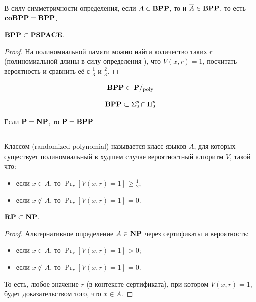 \begin{definition}
В силу симметричности определения, если $A \in \textbf{BPP}$, то и $\overline{A} \in \textbf{BPP}$, то есть $\mathbf{coBPP} = \textbf{BPP}$.
\end{definition}

\begin{statement}
$\textbf{BPP} \subset \textbf{PSPACE}$.
\end{statement}

\begin{proof} На полиномиальной памяти можно найти количество таких $r$ (полиномиальной длины в силу определения \bpp), что $V(x, r) = 1$, посчитать вероятность и сравнить её с $\frac{1}{3}$ и $\frac{2}{3}$.
\end{proof}

\begin{theorem}[Эйдлмана]
$$
\textbf{BPP} \subset \textbf{P}/_{\mathrm{poly}}
$$
\end{theorem}

\begin{theorem}
$$
\textbf{BPP} \subset \Sigma_2^p \cap \Pi_2^p
$$
\end{theorem}

\begin{corollary}
Если $\textbf{P} = \textbf{NP}$, то $\textbf{P} = \textbf{BPP}$
\end{corollary}

\subsection{\rp}

\begin{definition}
Классом \rp (randomized polynomial) называется класс языков $A$, для которых существует полиномиальный в худшем случае вероятностный алгоритм $V$, такой что:

\begin{itemize}
    \item если $x \in A$, то $\Pr_r[V(x,r) = 1] \geq \frac{1}{2}$;
    \item если $x \not\in A$, то $\Pr_r[V(x,r) = 1] = 0$.
\end{itemize}
\end{definition}

\begin{statement}
$\textbf{RP} \subset \textbf{NP}$.
\end{statement}

\begin{proof} Альтернативное определение $A \in \textbf{NP}$ через сертификаты и вероятность:

\begin{itemize}
    \item если $x \in A$, то $\Pr_r[V(x,r) = 1] > 0$;
    \item если $x \not\in A$, то $\Pr_r[V(x,r) = 1] = 0$.
\end{itemize}

То есть, любое значение $r$ (в контексте \np сертификата), при котором $V(x, r) = 1$, будет доказательством того, что $x \in A$.
\end{proof}

